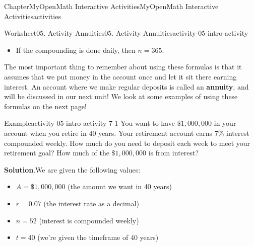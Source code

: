 \documentclass[oneside,10pt,]{book}
\newcommand{\blocktitlefont}{\relax}
\newcommand{\ptxlistdisc}{\raisebox{0.3ex}{\textbullet}}
\newcommand{\terminology}[1]{\textbf{#1}}
\newlength{\fillinmaxwidth}
\newlength{\fillincontract}
\newlength{\charmaxwidth}\setlength{\charmaxwidth}{0.5em}
\newlength{\charminwidth}\setlength{\charminwidth}{0.1em}
\newlength{\fillinheight}
\newcommand{\fillintext}[1]{%
\setlength{\fillinmaxwidth}{#1\charmaxwidth}%
\setlength{\fillincontract}{#1\charminwidth}%
\setlength{\fillinheight}{\baselineskip}\addtolength{\fillinheight}{1.2pt}%
\strut\nobreak\leaders\vbox{\hrule width 0.3pt height 0.3pt \vskip -1.2pt}\hskip 1\fillinmaxwidth minus \fillincontract\nobreak\strut%
}
\begin{document}
\begin{chapterptx}{Chapter}{MyOpenMath Interactive Activities}{}{MyOpenMath Interactive Activities}{}{}{activities}
\begin{worksheet-section}{Worksheet}{05. Activity Annuities}{}{05. Activity Annuities}{}{}{activity-05-intro-activity}
\begin{itemize}[label=\ptxlistdisc]
\item{}If the compounding is done daily, then \(n = 365\).%
\end{itemize}
%
\par
The most important thing to remember about using these formulas is that it assumes that we put money in the account once and let it sit there earning interest. An account where we make regular deposits is called an \terminology{annuity}, and will be discussed in our next unit! We look at some examples of using these formulas on the next page!%
\clearpage
{}%
\clearpage
\begin{example}{Example}{}{activity-05-intro-activity-7-1}%
You want to have \(\$1,000,000\) in your account when you retire in \(40\) years. Your retirement account earns \(7\%\) interest compounded weekly. How much do you need to deposit each week to meet your retirement goal? How much of the \(\$1,000,000\) is from interest?%
\par\smallskip%
\noindent\textbf{\blocktitlefont Solution}.\hypertarget{activity-05-intro-activity-7-1-2}{}\quad{}We are given the following values:%
\begin{itemize}[label=\ptxlistdisc]
\item{}\(A = \$1,000,000\) (the amount we want in 40 years)%
\item{}\(r = 0.07\) (the interest rate as a decimal)%
\item{}\(n = 52\) (interest is compounded weekly)%
\item{}\(t = 40\) (we're given the timeframe of 40 years)%
\end{itemize}

\end{example}
\end{worksheet-section}
\end{chapterptx}
\end{document}
